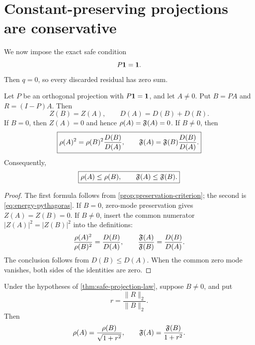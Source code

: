 \section{Constant-preserving projections are conservative}
\label{sec:safe-projection}

We now impose the exact safe condition
\[
 P\mathbf 1=\mathbf 1.
\]
Then \(q=0\), so every discarded residual has zero sum.

\begin{theorem}
\label{thm:safe-projection-law}
Let \(P\) be an orthogonal projection with \(P\mathbf 1=\mathbf 1\), and let
\(A\ne0\).  Put \(B=PA\) and \(R=(I-P)A\).  Then
\begin{equation}
 \boxed{
 Z(B)=Z(A),\qquad
 D(A)=D(B)+D(R).}
\label{eq:safe-ledger}
\end{equation}
If \(B=0\), then \(Z(A)=0\) and hence \(\rho(A)=\mathfrak F(A)=0\).
If \(B\ne0\), then
\begin{equation}
 \boxed{
 \rho(A)^2
 =
 \rho(B)^2\frac{D(B)}{D(A)},\qquad
 \mathfrak F(A)
 =
 \mathfrak F(B)\frac{D(B)}{D(A)}.}
\label{eq:exact-projection-monotonicity}
\end{equation}
Consequently,
\begin{equation}
 \boxed{
 \rho(A)\le\rho(B),\qquad
 \mathfrak F(A)\le\mathfrak F(B).}
\label{eq:projection-monotonicity}
\end{equation}
\end{theorem}

\begin{proof}
The first formula follows from
\cref{prop:preservation-criterion}; the second is
\eqref{eq:energy-pythagoras}.  If \(B=0\), zero-mode preservation
gives \(Z(A)=Z(B)=0\).  If \(B\ne0\), insert the common numerator
\(|Z(A)|^2=|Z(B)|^2\) into the definitions:
\[
 \frac{\rho(A)^2}{\rho(B)^2}
 =
 \frac{D(B)}{D(A)},
\qquad
 \frac{\mathfrak F(A)}{\mathfrak F(B)}
 =
 \frac{D(B)}{D(A)}.
\]
The conclusion follows from \(D(B)\le D(A)\).  When the common zero
mode vanishes, both sides of the identities are zero.
\end{proof}

\begin{corollary}
\label{cor:residual-factor}
Under the hypotheses of \cref{thm:safe-projection-law}, suppose
\(B\ne0\), and put
\[
 r=\frac{\|R\|_2}{\|B\|_2}.
\]
Then
\begin{equation}
 \rho(A)=\frac{\rho(B)}{\sqrt{1+r^2}},
\qquad
 \mathfrak F(A)=\frac{\mathfrak F(B)}{1+r^2}.
\label{eq:residual-factor}
\end{equation}
\end{corollary}


